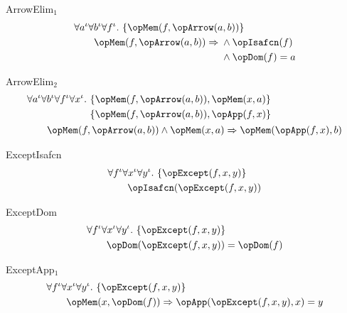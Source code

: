 \documentclass[11pt, a4paper, oneside]{article}
\begin{document}
\begin{axioms}
\item[ArrowElim$_1$] \[
        \begin{aligned}
            &\forall a^\idv \forall b^\idv \forall f^\idv.\, \st{ \opMem(f, \opArrow(a, b)) } \\
            &\qquad \opMem(f, \opArrow(a, b)) \imp \begin{aligned}[t]
                &\wedge \opIsafcn(f) \\
                &\wedge \opDom(f) = a
            \end{aligned}
        \end{aligned}
    \]

\item[ArrowElim$_2$] \[
        \begin{aligned}
            &\forall a^\idv \forall b^\idv \forall f^\idv \forall x^\idv.\, \begin{aligned}[t]
                &\st{ \opMem(f, \opArrow(a, b)), \opMem(x, a) } \\
                &\st{ \opMem(f, \opArrow(a, b)), \opApp(f, x) }
            \end{aligned} \\
            &\qquad \opMem(f, \opArrow(a, b)) \wedge \opMem(x, a) \imp \opMem(\opApp(f, x), b)
        \end{aligned}
    \]

\item[ExceptIsafcn] \[
        \begin{aligned}
            &\forall f^\idv \forall x^\idv \forall y^\idv.\, \st{ \opExcept(f, x, y) } \\
            &\qquad \opIsafcn(\opExcept(f, x, y))
        \end{aligned}
    \]

\item[ExceptDom] \[
        \begin{aligned}
            &\forall f^\idv \forall x^\idv \forall y^\idv.\, \st{ \opExcept(f, x, y) } \\
            &\qquad \opDom(\opExcept(f, x, y)) = \opDom(f)
        \end{aligned}
    \]

\item[ExceptApp$_1$] \[
        \begin{aligned}
            &\forall f^\idv \forall x^\idv \forall y^\idv.\, \st{ \opExcept(f, x, y) } \\
            &\qquad \opMem(x, \opDom(f)) \imp \opApp(\opExcept(f, x, y), x) = y
        \end{aligned}
    \]


\end{axioms}
\end{document}
